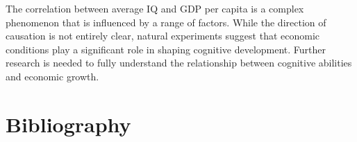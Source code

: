 \documentclass{article}
\begin{document}
The correlation between average IQ and GDP per capita is a complex phenomenon that is influenced by a range of factors. While the direction of causation is not entirely clear, natural experiments suggest that economic conditions play a significant role in shaping cognitive development. Further research is needed to fully understand the relationship between cognitive abilities and economic growth.

\section{Bibliography}



\end{document}
